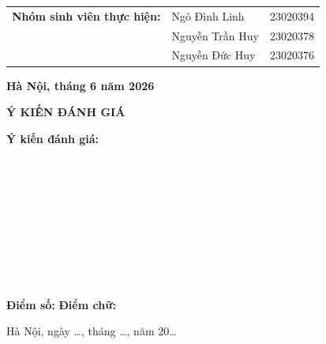 \documentclass[12pt,a4paper]{article}
\begin{document}
\begin{titlepage}
\begin{center}
\begin{tabular}{l l r}
    \textbf{Nhóm sinh viên thực hiện:}
    & Ngô Đình Linh
    & 23020394 \\

    &
    Nguyễn Trần Huy
    & 23020378 \\

    &
    Nguyễn Đức Huy
    & 23020376 \\
    \end{tabular}
    \end{center}

    \vspace{1.0cm}

    {\large \textbf{Hà Nội, tháng 6 năm 2026}}

\end{titlepage}

\newpage
\thispagestyle{empty}

\begin{center}
    {\Large \textbf{Ý KIẾN ĐÁNH GIÁ}}
\end{center}

\vspace{0.8cm}

\noindent
\textbf{Ý kiến đánh giá:}

\vspace{0.5cm}

\noindent
\makebox[\textwidth]{\dotfill}\\[0.6cm]
\makebox[\textwidth]{\dotfill}\\[0.6cm]
\makebox[\textwidth]{\dotfill}\\[0.6cm]
\makebox[\textwidth]{\dotfill}\\[0.6cm]
\makebox[\textwidth]{\dotfill}\\[0.6cm]
\makebox[\textwidth]{\dotfill}\\[0.6cm]
\makebox[\textwidth]{\dotfill}\\[0.6cm]
\makebox[\textwidth]{\dotfill}\\[0.6cm]
\makebox[\textwidth]{\dotfill}\\[1cm]

\noindent
\textbf{Điểm số:} \dotfill \hspace{1cm}
\textbf{Điểm chữ:} \dotfill

\vspace{1.2cm}

\begin{flushright}
    Hà Nội, ngày \dots, tháng \dots, năm 20\dots
\end{flushright}
\end{document}

